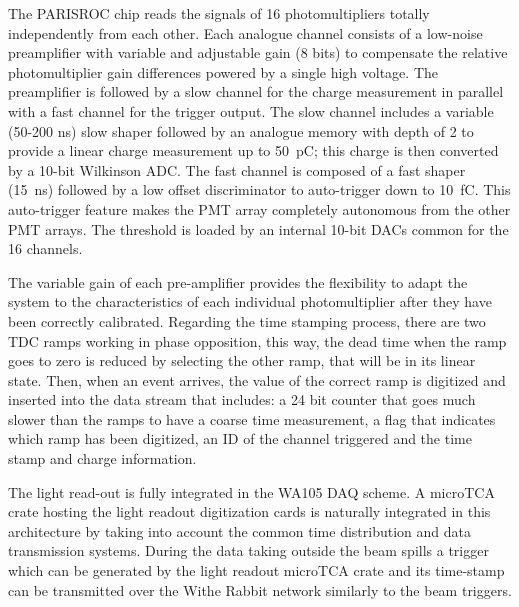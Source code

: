 The PARISROC chip reads the signals of 16 photomultipliers totally
independently from each other. Each analogue channel consists of a
low-noise preamplifier with variable and adjustable gain (8 bits) to
compensate the relative photomultiplier gain differences powered by a
single high voltage. The preamplifier is followed by a slow channel
for the charge measurement in parallel with a fast channel for the
trigger output. The slow channel includes a variable (50-200 ns) slow
shaper followed by an analogue memory with depth of 2 to provide a
linear charge measurement up to 50~pC; this charge is then converted
by a 10-bit Wilkinson ADC. The fast channel is composed of a fast
shaper (15~ns) followed by a low offset discriminator to auto-trigger
down to 10~fC. This auto-trigger feature makes the PMT array
completely autonomous from the other PMT arrays. The threshold is
loaded by an internal 10-bit DACs common for the 16 channels.


The variable gain of each pre-amplifier provides the flexibility to
adapt the system to the characteristics of each individual
photomultiplier after they have been correctly calibrated. Regarding
the time stamping process, there are two TDC ramps working in phase
opposition, this way, the dead time when the ramp goes to zero is
reduced by selecting the other ramp, that will be in its linear
state. Then, when an event arrives, the value of the correct ramp is
digitized and inserted into the data stream that includes: a 24 bit
counter that goes much slower than the ramps to have a coarse time
measurement, a flag that indicates which ramp has been digitized, an
ID of the channel triggered and the time stamp and charge information.


The light read-out is fully integrated in the WA105 DAQ scheme. A
microTCA crate hosting the light readout digitization cards is
naturally integrated in this architecture by taking into account the
common time distribution and data transmission systems.  During the
data taking outside the beam spills a trigger which can be generated
by the light readout microTCA crate and its time-stamp can be
transmitted over the Withe Rabbit network similarly to the beam
triggers.

